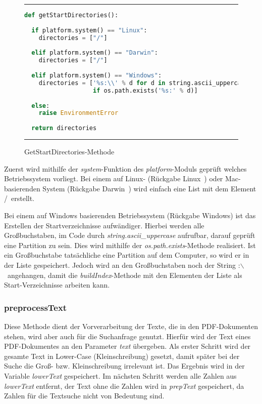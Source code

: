 \begin{figure}
	\rule{\textwidth}{0.4pt}
	\begin{lstlisting}[language=Python]
def getStartDirectories():
	
  if platform.system() == "Linux":
    directories = ["/"]
	
  elif platform.system() == "Darwin":
    directories = ["/"]
	
  elif platform.system() == "Windows":
    directories = ['%s:\\' % d for d in string.ascii_uppercase
                   if os.path.exists('%s:' % d)]
	
  else:
    raise EnvironmentError
	
  return directories
	\end{lstlisting}
	\rule{\textwidth}{0.4pt}
	\caption{GetStartDirectories-Methode}
	\label{fig:start}
\end{figure}

Zuerst wird mithilfe der \textit{system}-Funktion des \textit{platform}-Moduls geprüft welches Betriebssystem vorliegt. Bei einem auf Linux- (Rückgabe \glqq Linux\grqq\ ) oder Mac-basierenden System (Rückgabe \glqq Darwin\grqq\ ) wird einfach eine List mit dem Element \glqq /\grqq\ erstellt.

Bei einem auf Windows basierenden Betriebssystem (Rückgabe \glqq Windows\grqq ) ist das Erstellen der Startverzeichnisse aufwändiger. Hierbei werden alle Großbuchstaben, im Code durch \textit{string.ascii\_uppercase} aufrufbar, darauf geprüft eine Partition zu sein. Dies wird mithilfe der \textit{os.path.exists}-Methode realisiert. Ist ein Großbuchstabe tatsächliche eine Partition auf dem Computer, so wird er in der Liste gespeichert. Jedoch wird an den Großbuchstaben noch der String \glqq :$\backslash$\grqq\ angehangen, damit die \textit{buildIndex}-Methode mit den Elementen der Liste als Start-Verzeichnisse arbeiten kann.

\subsubsection{preprocessText}\label{preprocess}
Diese Methode dient der Vorverarbeitung der Texte, die in den PDF-Dokumenten stehen, wird aber auch für die Suchanfrage genutzt. Hierfür wird der Text eines PDF-Dokumentes an den Parameter \textit{text} übergeben. Als erster Schritt wird der gesamte Text in Lower-Case (Kleinschreibung) gesetzt, damit später bei der Suche die Groß- bzw. Kleinschreibung irrelevant ist. Das Ergebnis wird in der Variable \textit{lowerText} gespeichert. Im nächsten Schritt werden alle Zahlen aus \textit{lowerText} entfernt, der Text ohne die Zahlen wird in \textit{prepText} gespeichert, da Zahlen für die Textsuche nicht von Bedeutung sind.

